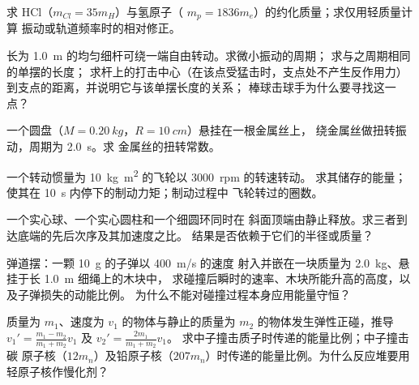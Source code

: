 \begin{exercise}[$\star\star$]\label{exo:b1:systems-of-points:6}
求 HCl（$m_{Cl} = 35m_H$）与氢原子（
$m_p = 1836m_e$）的约化质量；求仅用轻质量计算
振动或轨道频率时的相对修正。
\end{exercise}

\begin{exercise}[$\star\star$]\label{exo:b1:systems-of-points:7}
长为 \qty{1.0}{m} 的均匀细杆可绕一端自由转动。求微小振动的周期；
求与之周期相同的单摆的长度；
求杆上的打击中心（在该点受猛击时，支点处不产生反作用力）
到支点的距离，并说明它与该单摆长度的关系；
棒球击球手为什么要寻找这一点？
\end{exercise}

\begin{exercise}[$\star\star$]\label{exo:b1:systems-of-points:8}
一个圆盘（$M = \qty{0.20}{kg}$，$R = \qty{10}{cm}$）悬挂在一根金属丝上，
绕金属丝做扭转振动，周期为 \qty{2.0}{s}。求
金属丝的扭转常数。
\end{exercise}

\begin{exercise}[$\star\star$]\label{exo:b1:systems-of-points:9}
一个转动惯量为 \qty{10}{kg.m^2} 的飞轮以 \qty{3000}{rpm} 的转速转动。
求其储存的能量；使其在 \qty{10}{s} 内停下的制动力矩；制动过程中
飞轮转过的圈数。
\end{exercise}

\begin{exercise}[$\star\star\star$]\label{exo:b1:systems-of-points:10}
一个实心球、一个实心圆柱和一个细圆环同时在
斜面顶端由静止释放。求三者到达底端的先后次序及其加速度之比。
结果是否依赖于它们的半径或质量？
\end{exercise}

\begin{exercise}[$\star\star\star$]\label{exo:b1:systems-of-points:11}
弹道摆：一颗 \qty{10}{g} 的子弹以 \qty{400}{m/s} 的速度
射入并嵌在一块质量为 \qty{2.0}{kg}、悬挂于长 \qty{1.0}{m} 细绳上的木块中，
求碰撞后瞬时的速率、木块所能升高的高度，以及子弹损失的动能比例。
为什么不能对碰撞过程本身应用能量守恒？
\end{exercise}

\begin{exercise}[$\star\star\star$]\label{exo:b1:systems-of-points:12}
质量为 $m_1$、速度为 $v_1$ 的物体与静止的质量为 $m_2$ 的物体发生弹性正碰，推导
$v_1' = \frac{m_1 - m_2}{m_1 + m_2}v_1$ 及 $v_2' = \frac{2m_1}{m_1 + m_2}v_1$。
求中子撞击质子时传递的能量比例；中子撞击碳
原子核（$12m_n$）及铅原子核（$207m_n$）时传递的能量比例。为什么反应堆要用
轻原子核作慢化剂？
\end{exercise}

